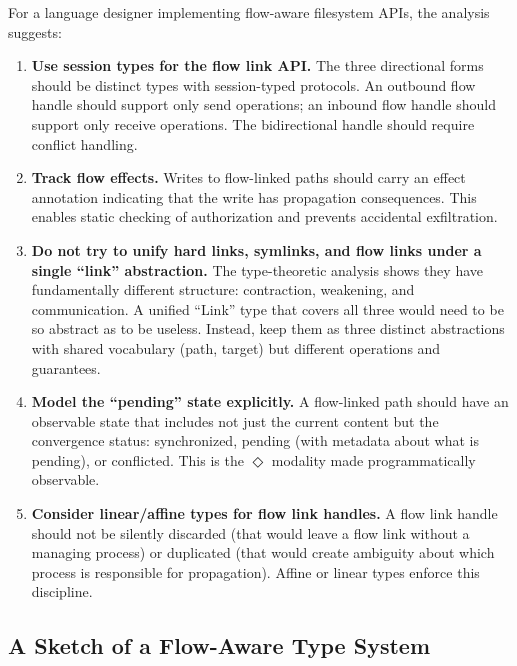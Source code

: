 \documentclass[11pt]{article}
\newcommand{\eventually}{\Diamond}
\begin{document}
For a language designer implementing flow-aware filesystem APIs, the analysis
suggests:

\begin{enumerate}
  \item \textbf{Use session types for the flow link API.} The three directional
    forms should be distinct types with session-typed protocols. An outbound
    flow handle should support only send operations; an inbound flow handle
    should support only receive operations. The bidirectional handle should
    require conflict handling.

  \item \textbf{Track flow effects.} Writes to flow-linked paths should carry
    an effect annotation indicating that the write has propagation
    consequences. This enables static checking of authorization and prevents
    accidental exfiltration.

  \item \textbf{Do not try to unify hard links, symlinks, and flow links under
    a single ``link'' abstraction.} The type-theoretic analysis shows they have
    fundamentally different structure: contraction, weakening, and
    communication. A unified ``Link'' type that covers all three would need to
    be so abstract as to be useless. Instead, keep them as three distinct
    abstractions with shared vocabulary (path, target) but different
    operations and guarantees.

  \item \textbf{Model the ``pending'' state explicitly.} A flow-linked path
    should have an observable state that includes not just the current content
    but the convergence status: synchronized, pending (with metadata about what
    is pending), or conflicted. This is the $\eventually$ modality made
    programmatically observable.

  \item \textbf{Consider linear/affine types for flow link handles.} A flow
    link handle should not be silently discarded (that would leave a flow link
    without a managing process) or duplicated (that would create ambiguity
    about which process is responsible for propagation). Affine or linear
    types enforce this discipline.
\end{enumerate}

\subsection{A Sketch of a Flow-Aware Type System}
\end{document}
